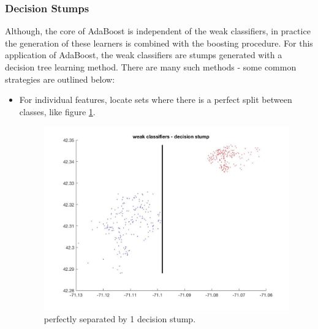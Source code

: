 \documentclass[10pt,twocolumn,letterpaper]{article}
\begin{document}
\subsubsection{Decision Stumps}
Although, the core of AdaBoost is independent of the weak classifiers, in practice the generation of these learners is combined with the boosting procedure. For this application of AdaBoost, the weak classifiers are stumps generated with a decision tree learning method. There are many such methods - some common strategies are outlined below:
\begin{itemize}
\item For individual features, locate sets where there is a perfect split between classes, like figure \ref{fig:stump1}.

\begin{figure}[h!]
  \includegraphics[width=\linewidth]{decisionstump_1.jpg}
  \caption{perfectly separated by 1 decision stump.}
  \label{fig:stump1}
\end{figure}


\end{itemize}
\end{document}
